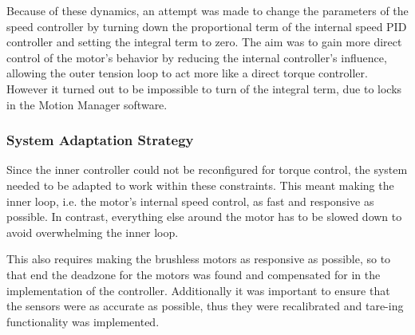 Because of these dynamics, an attempt was made to change the parameters of the speed controller by turning down the proportional term of the internal speed PID controller and setting the integral term to zero. The aim was to gain more direct control of the motor's behavior by reducing the internal controller's influence, allowing the outer tension loop to act more like a direct torque controller. However it turned out to be impossible to turn of the integral term, due to locks in the Motion Manager software.

\subsubsection{System Adaptation Strategy}
Since the inner controller could not be reconfigured for torque control, the system needed to be adapted to work within these constraints. This meant making the inner loop, i.e. the motor's internal speed control, as fast and responsive as possible. In contrast, everything else around the motor has to be slowed down to avoid overwhelming the inner loop.

This also requires making the brushless motors as responsive as possible, so to that end the deadzone for the motors was found and compensated for in the implementation of the controller. Additionally it was important to ensure that the sensors were as accurate as possible, thus they were recalibrated and tare-ing functionality was implemented.

